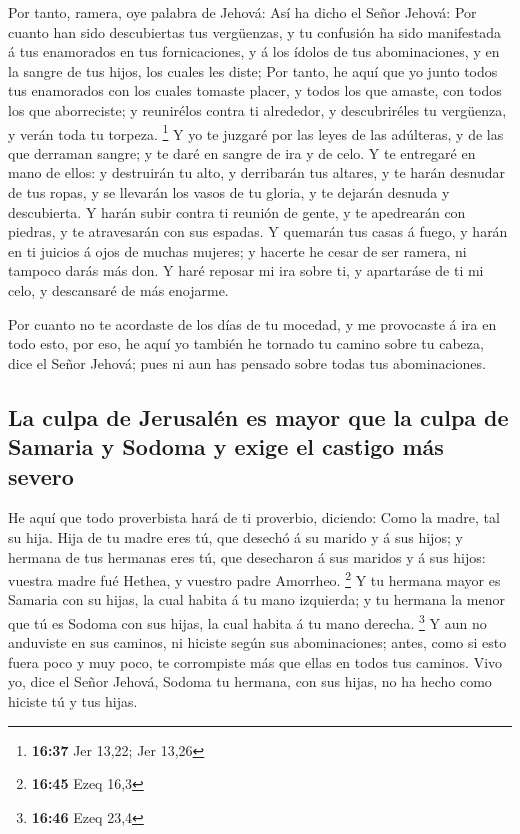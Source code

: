  Por tanto, ramera, oye palabra de Jehová:
 Así ha dicho el Señor Jehová: Por cuanto han sido
descubiertas tus vergüenzas, y tu confusión ha sido manifestada á tus
enamorados en tus fornicaciones, y á los ídolos de tus abominaciones, y
en la sangre de tus hijos, los cuales les diste;  Por
tanto, he aquí que yo junto todos tus enamorados con los cuales tomaste
placer, y todos los que amaste, con todos los que aborreciste; y
reunirélos contra ti alrededor, y descubriréles tu vergüenza, y verán
toda tu torpeza. \footnote{\textbf{16:37} Jer 13,22; Jer 13,26}
 Y yo te juzgaré por las leyes de las adúlteras, y de las
que derraman sangre; y te daré en sangre de ira y de celo.
 Y te entregaré en mano de ellos: y destruirán tu alto, y
derribarán tus altares, y te harán desnudar de tus ropas, y se llevarán
los vasos de tu gloria, y te dejarán desnuda y descubierta.
 Y harán subir contra ti reunión de gente, y te
apedrearán con piedras, y te atravesarán con sus espadas.
 Y quemarán tus casas á fuego, y harán en ti juicios á
ojos de muchas mujeres; y hacerte he cesar de ser ramera, ni tampoco
darás más don.  Y haré reposar mi ira sobre ti, y
apartaráse de ti mi celo, y descansaré de más enojarme.

 Por cuanto no te acordaste de los días de tu mocedad, y
me provocaste á ira en todo esto, por eso, he aquí yo también he tornado
tu camino sobre tu cabeza, dice el Señor Jehová; pues ni aun has pensado
sobre todas tus abominaciones.

\hypertarget{la-culpa-de-jerusaluxe9n-es-mayor-que-la-culpa-de-samaria-y-sodoma-y-exige-el-castigo-muxe1s-severo}{%
\subsection{La culpa de Jerusalén es mayor que la culpa de Samaria y
Sodoma y exige el castigo más
severo}\label{la-culpa-de-jerusaluxe9n-es-mayor-que-la-culpa-de-samaria-y-sodoma-y-exige-el-castigo-muxe1s-severo}}

 He aquí que todo proverbista hará de ti proverbio,
diciendo: Como la madre, tal su hija.  Hija de tu madre
eres tú, que desechó á su marido y á sus hijos; y hermana de tus
hermanas eres tú, que desecharon á sus maridos y á sus hijos: vuestra
madre fué Hethea, y vuestro padre Amorrheo. \footnote{\textbf{16:45}
  Ezeq 16,3}  Y tu hermana mayor es Samaria con su hijas,
la cual habita á tu mano izquierda; y tu hermana la menor que tú es
Sodoma con sus hijas, la cual habita á tu mano derecha. \footnote{\textbf{16:46}
  Ezeq 23,4}  Y aun no anduviste en sus caminos, ni
hiciste según sus abominaciones; antes, como si esto fuera poco y muy
poco, te corrompiste más que ellas en todos tus caminos. 
Vivo yo, dice el Señor Jehová, Sodoma tu hermana, con sus hijas, no ha
hecho como hiciste tú y tus hijas.

